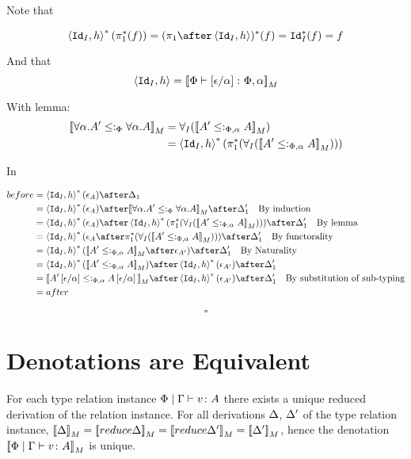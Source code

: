 \documentclass{report}
\begin{document}
        Note that 

        \begin{equation}
            \pr{\Id{I}}{h}\star(\pstar(f)) = (\p\after\pr{\Id{I}}{h})\star(f) = \Id{I}\star(f) = f
        \end{equation}

        And that 
        \begin{equation}
            \left\langle\texttt{Id}_{I}, h\right\rangle = {\bf [\![}\Phi \vdash \left[\epsilon / \alpha\right] \colon \Phi,\alpha{\bf ]\!]}_M
        \end{equation}

        With lemma:
        \begin{align}
            {\bf [\![}\forall \alpha. A'\leq:_\Phi{\forall \alpha. A}{\bf ]\!]}_M & = \forall_I({\bf [\![}A' \leq:_{\Phi, \alpha} A{\bf ]\!]}_M)\\
            & = \left\langle\texttt{Id}_{I}, h\right\rangle^*(\pi_1^*(\forall_I({\bf [\![}A' \leq:_{\Phi, \alpha} A{\bf ]\!]}_M)))
        \end{align}

        In

        \begin{align}
            before &= \pr{\Id{I}}{h}\star(\e_A)\after\D_1\\
            &= \pr{\Id{I}}{h}\star(\e_A)\after\deno{\all{\a}{A'}\subtypep{\all{\a}{A}}}\after\D_1'\qt{By induction}\\
            &= \pr{\Id{I}}{h}\star(\e_A)\after\pr{\Id{I}}{h}\star(\pstar(\allI(\deno{A' \subtypepa A})))\after\D_1'\qt{By lemma}\\
            &= \pr{\Id{I}}{h}\star(\e_A\after \pstar(\allI(\deno{A' \subtypepa A})))\after\D_1'\qt{By functorality}\\
            & = \pr{\Id{I}}{h}\star(\deno{A' \subtypepa A}\after\e_{A'})\after\D_1'\qt{By Naturality}\\
            & =  \pr{\Id{I}}{h}\star(\deno{A' \subtypepa A})\after\pr{\Id{I}}{h}\star(\e_{A'})\after\D_1'\\
            & =  \deno{A'\ssub{\a}{\e} \subtypepa A\ssub{\a}{\e}}\after\pr{\Id{I}}{h}\star(\e_{A'})\after\D_1'\qt{By substitution of sub-typing}\\
            & = after
        \end{align}
        
    $$\square$$   

    \section{Denotations are Equivalent}
    For each type relation instance $\Phi\mid\Gamma \vdash v \colon A$ there exists a unique reduced derivation of the relation instance. For all derivations $\Delta$, $\Delta'$ of the type relation instance, $\deno{\D} = \deno{\reduce{\D}} = \deno{\reduce{\D'}} = \deno{\D'} $, hence the denotation ${\bf [\![}\Phi\mid\Gamma \vdash v \colon A{\bf ]\!]}_M$ is unique.
\end{document}
